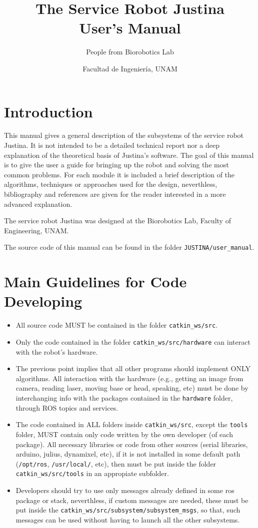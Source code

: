 \documentclass[letterpaper,10pt]{article}
\title{The Service Robot Justina\\User's Manual}
\author{People from Biorobotics Lab}%
\date{Facultad de Ingeniería, UNAM}
\begin{document}
\renewcommand{\BOthers}[1]{et al.\hbox{}}
\maketitle
\tableofcontents

\section{Introduction}
This manual gives a general description of the subsystems of the service robot Justina. It is not intended to be a detailed technical report nor a deep explanation of the theoretical basis of Justina's software. The goal of this manual is to give the user a guide for bringing up the robot and solving the most common problems. For each module it is included a brief description of the algorithms, techniques or approaches used for the design, neverthless, bibliography and references are given for the reader interested in a more advanced explanation.

The service robot Justina was designed at the Biorobotics Lab, Faculty of Engineering, UNAM. 

The source code of this manual can be found in the folder \texttt{JUSTINA/user\_manual}.

\section{Main Guidelines for Code Developing}
\begin{itemize}
\item All source code MUST be contained in the folder \texttt{catkin\_ws/src}.
\item Only the code contained in the folder \texttt{catkin\_ws/src/hardware} can interact with the robot's hardware.
\item The previous point implies that all other programs should implement ONLY algorithms. All interaction with the hardware (e.g., getting an image from camera, reading laser, moving base or head, speaking, etc) must be done by interchanging info with the packages contained in the \texttt{hardware} folder, through ROS topics and services. 
\item The code contained in ALL folders inside \texttt{catkin\_ws/src}, except the \texttt{tools} folder, MUST contain only code written by the own developer (of each package). All necessary libraries or code from other sources (serial libraries, arduino, julius, dynamixel, etc), if it is not installed in some default path (\texttt{/opt/ros}, \texttt{/usr/local/}, etc), then must be put inside the folder \texttt{catkin\_ws/src/tools} in an appropiate subfolder.
\item Developers should try to use only messages already defined in some ros package or stack, neverthless, if custom messages are needed, these must be put inside the \texttt{catkin\_ws/src/subsystem/subsystem\_msgs}, so that, such messages can be used without having to launch all the other subsystems. 
\end{itemize}
\end{document}
